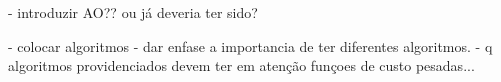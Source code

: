 \cleardoublepage
\label{chap:implement}

- introduzir AO?? ou já deveria ter sido?

- colocar algoritmos
- dar enfase a importancia de ter diferentes algoritmos.
- q algoritmos providenciados devem ter em atenção funçoes de custo pesadas...